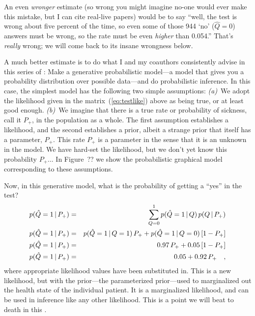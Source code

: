\documentclass[12pt,twoside]{article}
\begin{document}
An even \emph{wronger} estimate (so wrong you might imagine no-one
would ever make this mistake, but I can cite real-live
papers) would be to say ``well, the test is wrong about
five percent of the time, so even some of those 944 `no' ($\hat{Q}=0$)
answers must be wrong, so the rate must be even \emph{higher} than
0.054.''  That's \emph{really} wrong; we will come back to its insane
wrongness below.

A much better estimate is to do what I and my coauthors consistently
advise in this series of \documentnames: Make a generative
probabilistic model---a model that gives you a probability
distribution over possible data---and do
probabilistic inference.  In this case, the simplest model has the
following two simple assumptions: \textsl{(a)}~We adopt the likelihood
given in the matrix~(\ref{eq:testlike}) above as being true, or at
least good enough.  \textsl{(b)}~We imagine that there is a true rate
or probability of sickness, call it $P_+$, in the population as a
whole.  The first assumption establishes a likelihood, and the second
establishes a prior, albeit a strange prior that itself has a
parameter, $P_+$. This rate $P_+$ is a parameter in the sense that it
is an unknown in the model.  We have hard-set the likelihood, but we
don't yet know this probability $P_+$... In Figure~?? we show the
probabilistic graphical model corresponding to these assumptions.

Now, in this generative model, what is the probability of getting a
``yes'' in the test?
\begin{eqnarray}
p(\hat{Q}=1\,|\, P_+)
 &=& \sum_{Q=0}^1 p(\hat{Q}=1\,|\, Q)\,p(Q\,|\, P_+)
\\
p(\hat{Q}=1\,|\, P_+)
 &=& p(\hat{Q}=1\,|\, Q=1)\,P_+ + p(\hat{Q}=1\,|\, Q=0)\,[1 - P_+]
\\
p(\hat{Q}=1\,|\, P_+)
 &=& 0.97\,P_+ + 0.05\,[1 - P_+]
\\
p(\hat{Q}=1\,|\, P_+)
 &=& 0.05 + 0.92\,P_+
\quad,
\end{eqnarray}
where appropriate likelihood values have been substituted in.  This is
a new likelihood, but with the prior---the parameterized prior---used
to marginalized out the health state of the individual patient.  It is
a marginalized likelihood, and can be used in inference like any other
likelihood.  This is a point we will beat to death in this
\documentname.
\end{document}
